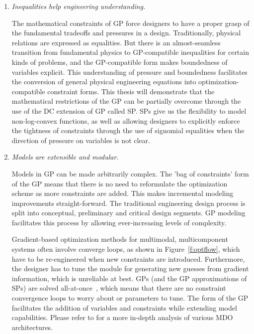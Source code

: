 \begin{enumerate}

    \item \textit{Inequalities help engineering understanding.}

    The mathematical constraints of \gls{GP} force designers to have a proper grasp
    of the fundamental tradeoffs and pressures in a design.
    Traditionally, physical relations are expressed as equalities. But there is an
    almost-seamless transition from fundamental physics to GP-compatible
    inequalities for certain kinds of problems, and the \gls{GP}-compatible
    form makes boundedness of variables explicit. This understanding of pressure
    and boundedness facilitates the conversion of general physical engineering
    equations into optimization-compatible constraint forms.
    This thesis will demonstrate that the mathematical restrictions of the \gls{GP} can be partially
    overcome through the use of the \gls{DC}
    extension of \gls{GP} called \gls{SP}. \gls{SP}s give us the flexibility to model
    non-log-convex functions, as well as allowing designers to explicitly enforce
    the tightness of
    constraints through the use of signomial equalities when the direction of pressure
    on variables is not clear.

    \item \textit{Models are extensible and modular.}

    Models in \gls{GP} can be made arbitrarily complex. The 'bag of constraints' form of the \gls{GP}
    means that there is no need to reformulate the optimization scheme as more
    constraints are added. This makes incremental modeling improvements straight-forward.
    The traditional engineering design process is split into conceptual, preliminary
    and critical design segments. \gls{GP} modeling facilitates this process by allowing
    ever-increasing levels of complexity.

    Gradient-based optimization methods for
    multimodal, multicomponent systems often involve
    converge loops, as shown in Figure~\ref{f:optflow}, which have to be re-engineered
    when new constraints are introduced. Furthermore, the designer has to tune
    the module for generating new guesses from gradient information, which is unreliable
    at best. \gls{GP}s (and the \gls{GP} approximations
    of \gls{SP}s) are solved all-at-once~\cite{martins_mdo}, which means that there are no constraint
    convergence loops to worry about or parameters to tune. The
    form of the GP facilitates the addition of variables and constraints while extending
    model capabilities. Please refer to \cite{martins_mdo}
    for a more in-depth analysis of various \gls{MDO} architectures.


\end{enumerate}
